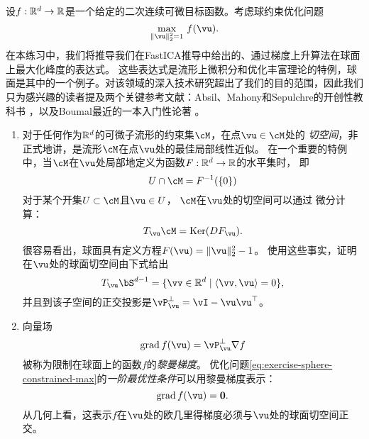 \documentclass[../../book-main_zh.tex]{subfiles}
\begin{document}
\begin{exercise}\label{exercise:sphere-calculus}
    设$f : \mathbb{R}^d \to \mathbb{R}$是一个给定的二次连续可微目标函数。考虑球约束优化问题
    \begin{equation}\label{eq:exercise-sphere-constrained-max}
        \max_{\norm{\vu}_2^2 = 1}\, f(\vu). 
    \end{equation}
    在本练习中，我们将推导我们在FastICA推导中给出的、通过梯度上升算法在球面上最大化峰度的表达式。
    这些表达式是流形上微积分和优化丰富理论的特例，球面是其中的一个例子。对该领域的深入技术研究超出了我们的目的范围，因此我们只为感兴趣的读者提及两个关键参考文献：Absil、Mahony和Sepulchre的开创性教科书
    \cite{Absil2009-nc}，以及Boumal最近的一本入门性论著 \cite{Boumal2023-rj}。
    \begin{enumerate}
        \item 对于任何作为$\mathbb{R}^d$的可微子流形的约束集$\cM$，在点$\vu \in \cM$处的
        \textit{切空间}，非正式地讲，是流形$\cM$在点$\vu$处的最佳局部线性近似。
        在一个重要的特例中，当$\cM$在$\vu$处局部地定义为函数$F : \mathbb{R}^d \to \mathbb{R}$的水平集时，
        即
        \begin{equation*}
            U \cap \cM = F^{-1}(\set{0})
        \end{equation*}
        对于某个开集$U \subset \cM$且$\vu \in U$，
        $\cM$在$\vu$处的切空间可以通过
        微分计算：
        \begin{equation*}
            T_{\vu} \cM = \Ker(DF_{\vu}).
        \end{equation*}
        很容易看出，球面具有定义方程$F(\vu) = \norm{\vu}_2^2 - 1$。
        使用这些事实，证明在$\vu$处的球面切空间由下式给出
        \begin{equation*}
            T_{\vu} \bS^{d-1} = \set{\vv \in \R^d \given \ip{\vv}{\vu} = 0},
        \end{equation*}
        并且到该子空间的正交投影是$\vP_{\vu}^\perp = \vI - \vu\vu^\top$。
        \item 向量场
        \begin{equation}\label{eq:exercise-riemann-grad-sphere}
        \mathrm{grad}\, f(\vu) = \vP_{\vu}^\perp \nabla f
        \end{equation}
        被称为限制在球面上的函数$f$的\textit{黎曼梯度}。
        优化问题\eqref{eq:exercise-sphere-constrained-max}的\textit{一阶最优性条件}可以用黎曼梯度表示：
        \begin{equation*}
            \mathrm{grad}\, f(\vu) = \mathbf{0}.
        \end{equation*}
        从几何上看，这表示$f$在$\vu$处的欧几里得梯度必须与$\vu$处的球面切空间正交。

\end{enumerate}
\end{exercise}
\end{document}
